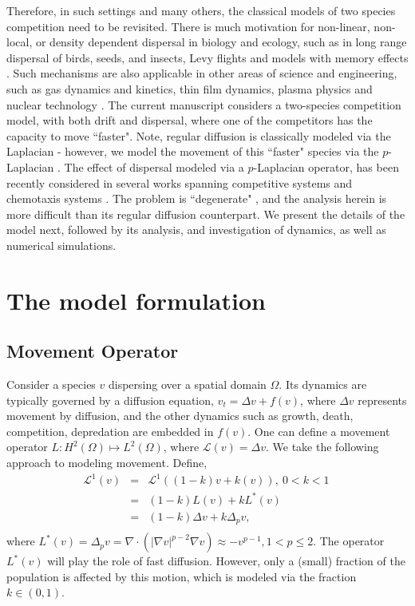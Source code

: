 \documentclass[10pt]{amsart}
\theoremstyle{plain}
\theoremstyle{definition}
\begin{document}
Therefore, in such settings and many others, the classical models of two species competition need to be revisited. There is much motivation for non-linear, non-local, or density dependent dispersal in biology and ecology, such as in long range dispersal of birds, seeds, and insects, Levy flights and models with memory eﬀects \cite{Ellefsen-21-2, Ellefsen21-1, Ellefsen23}. Such mechanisms are also applicable in other areas of science and engineering, such as gas dynamics and kinetics, thin film dynamics, plasma physics and nuclear technology \cite{naldi2010mathematical, chapman2015long, stinga2023fractional, song2019spatiotemporal, bonforte2024cauchy, vazquez2006porous, antontsev2015evolution}.
The current manuscript considers a two-species competition model, with both drift and dispersal, where one of the competitors has the capacity to move ``faster". Note, regular diffusion is classically modeled via the Laplacian - however, we model the movement of this ``faster" species via the $p$-Laplacian \cite{antontsev2015evolution}. 
The effect of dispersal modeled via a $p$-Laplacian operator, has been recently considered in several works spanning competitive systems and chemotaxis systems \cite{wang2023global, yang2022global, cong2016degenerate, rani2024global, li2020global}. The problem is ``degenerate" \cite{dibenedetto2012degenerate}, and the analysis herein is more difficult than its regular diffusion counterpart. We present the details of the model next, followed by its analysis, and investigation of dynamics, as well as numerical simulations.




\section{The model formulation}

\subsection{Movement Operator}

Consider a species $v$ dispersing over a spatial domain $\Omega$. Its dynamics are typically governed by a diffusion equation,
$v_{t} = \Delta v + f(v)$, where $\Delta v$ represents movement by diffusion, and the other dynamics such as growth, death, competition, depredation are embedded in $f(v)$. One can define a movement operator $L: H^{2}(\Omega) \mapsto L^{2}(\Omega)$, where $ \mathcal{L}(v) = \Delta v$.
We take the following approach to modeling movement. Define, 
\begin{eqnarray*}
\mathcal{L}^{1}(v)  
&=& \mathcal{L}^{1}((1-k)v + k(v)), \ 0<k<1 \  \nonumber \\
&=& (1-k)L(v) + kL^{*}(v) \nonumber \\
&=& (1-k) \Delta v + k \Delta_{p} v,  \nonumber \\
\end{eqnarray*}
 where $\boxed{L^{*}(v) = \Delta_{p} v =  \nabla \cdot (|\nabla v|^{p-2}  \nabla v) \approx - v^{p-1}}, 1<p\leq 2$. The operator $L^{*}(v)$ will play the role of fast diffusion. However, only a (small) fraction of the population is affected by this motion, which is modeled via the fraction $k \in (0,1)$.
\end{document}
